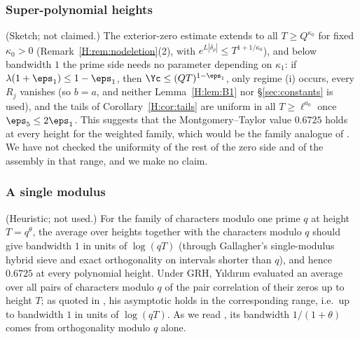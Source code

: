 \subsubsection*{Super-polynomial heights}\label{H:sec:superpoly}
(Sketch; not claimed.) The exterior-zero estimate extends to all $T\ge Q^{\kappa_0}$ for fixed $\kappa_0>0$ (Remark~\ref{H:rem:nodeletion}(2), with $e^{L|\delta_\rho|}\le T^{1+1/\kappa_0}$), and below bandwidth $1$ the prime side needs no parameter depending on $\kappa_1$: if $\lambda(1+\eps_1)\le1-\eps_1$, then $\Yc\le(QT)^{1-\eps_1}$, only regime (i) occurs, every $R_j$ vanishes (so $b=a$, and neither Lemma~\ref{H:lem:B1} nor \S\ref{sec:constants} is used), and the tails of Corollary~\ref{H:cor:tails} are uniform in all $T\ge\ell^{a_0}$ once $\eps_5\le2\eps_1$. This suggests that the Montgomery--Taylor value $0.6725$ holds at every height for the weighted family, which would be the family analogue of \cite[Theorem~B]{AF26}. We have not checked the uniformity of the rest of the zero side and of the assembly in that range, and we make no claim.

\subsubsection*{A single modulus}
(Heuristic; not used.) For the family of characters modulo one prime $q$ at height $T=q^\theta$, the average over heights together with the characters modulo $q$ should give bandwidth $1$ in units of $\log(qT)$ (through Gallagher's single-modulus hybrid sieve \cite[Theorem~2]{Gal70} and exact orthogonality on intervals shorter than $q$), and hence $0.6725$ at every polynomial height. Under GRH, Y{\i}ld{\i}r{\i}m \cite{Yil91} evaluated an average over all pairs of characters modulo $q$ of the pair correlation of their zeros up to height $T$; as quoted in \cite{KLM26}, his asymptotic holds in the corresponding range, i.e.\ up to bandwidth $1$ in units of $\log(qT)$. As we read \cite[Remark~2.4]{HY26b}, its bandwidth $1/(1+\theta)$ comes from orthogonality modulo $q$ alone.

